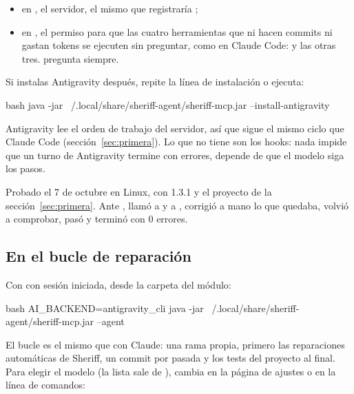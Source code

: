 \documentclass[11pt,a4paper]{article}
\begin{document}
\begin{itemize}
  \item en , el servidor, el mismo que
        registraría ;
  \item en , el permiso para que
        las cuatro herramientas que ni hacen commits ni gastan tokens se
        ejecuten sin preguntar, como en Claude Code: 
        y las otras tres.  pregunta siempre.
\end{itemize}

Si instalas Antigravity después, repite la línea de instalación o ejecuta:

\begin{command}[basicstyle=\ttfamily\footnotesize]{bash}
java -jar ~/.local/share/sheriff-agent/sheriff-mcp.jar --install-antigravity
\end{command}

Antigravity lee el orden de trabajo del servidor, así que sigue el mismo ciclo
que Claude Code (sección~\ref{sec:primera}). Lo que no tiene son los hooks: nada impide que un turno de Antigravity termine
con errores, depende de que el modelo siga los pasos.

\begin{note}
Probado el 7 de octubre en Linux, con  1.3.1 y el proyecto
 de la sección~\ref{sec:primera}. Ante , llamó a  y a
, corrigió a mano lo que quedaba, volvió a comprobar, pasó
 y terminó con 0 errores.
\end{note}

\subsection{En el bucle de reparación}

Con  con sesión iniciada, desde la carpeta del módulo:

\begin{command}[basicstyle=\ttfamily\footnotesize]{bash}
AI_BACKEND=antigravity_cli java -jar ~/.local/share/sheriff-agent/sheriff-mcp.jar --agent
\end{command}

El bucle es el mismo que con Claude: una rama propia, primero las reparaciones
automáticas de Sheriff, un commit por pasada y los tests del proyecto al final.
Para elegir el modelo (la lista sale de ), cambia
 en la página de ajustes o en la línea de comandos:
\end{document}
